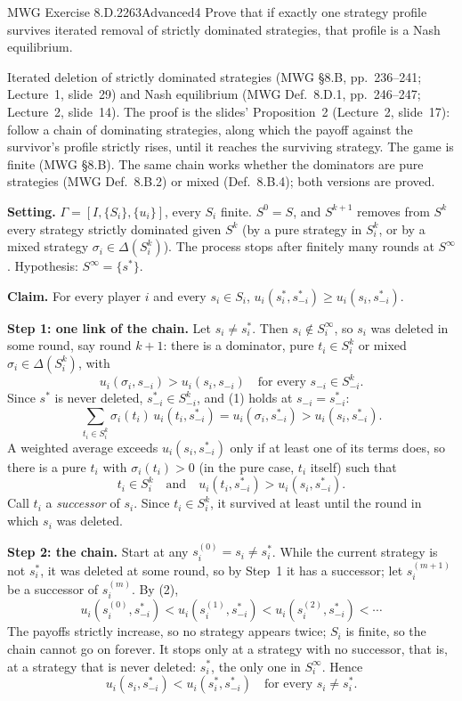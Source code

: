 \begin{exsol}{MWG Exercise 8.D.2}{263}{Advanced}{4}
\asked Prove that if exactly one strategy profile survives iterated removal of strictly dominated
strategies, that profile is a Nash equilibrium.

\method Iterated deletion of strictly dominated strategies (MWG \S8.B, pp.~236--241; Lecture~1,
slide~29) and Nash equilibrium (MWG Def.~8.D.1, pp.~246--247; Lecture~2, slide~14). The proof is
the slides' Proposition~2 (Lecture~2, slide~17): follow a chain of dominating strategies, along
which the payoff against the survivor's profile strictly rises, until it reaches the surviving
strategy. The game is finite (MWG \S8.B). The same chain works whether the dominators are pure
strategies (MWG Def.~8.B.2) or mixed (Def.~8.B.4); both versions are proved.

\solution
\textbf{Setting.} $\Gamma = [I, \{S_i\}, \{u_i\}]$, every $S_i$ finite. $S^0 = S$, and $S^{k+1}$
removes from $S^k$ every strategy strictly dominated given $S^k$ (by a pure strategy in $S^k_i$,
or by a mixed strategy $\sigma_i \in \Delta(S^k_i)$). The process stops after finitely many rounds
at $S^\infty$. Hypothesis: $S^\infty = \{s^*\}$.

\textbf{Claim.} For every player $i$ and every $s_i \in S_i$, $u_i(s_i^*, s_{-i}^*) \ge
u_i(s_i, s_{-i}^*)$.

\textbf{Step 1: one link of the chain.} Let $s_i \ne s_i^*$. Then $s_i \notin S^\infty_i$, so
$s_i$ was deleted in some round, say round $k+1$: there is a dominator, pure $t_i \in S^k_i$ or mixed
$\sigma_i \in \Delta(S^k_i)$, with
\[
  u_i(\sigma_i, s_{-i}) > u_i(s_i, s_{-i}) \quad \text{for every } s_{-i} \in S^k_{-i}. \tag{1}
\]
Since $s^*$ is never deleted, $s^*_{-i} \in S^k_{-i}$, and (1) holds at $s_{-i} = s^*_{-i}$:
\[
  \sum_{t_i \in S^k_i} \sigma_i(t_i)\, u_i(t_i, s^*_{-i}) = u_i(\sigma_i, s^*_{-i}) > u_i(s_i, s^*_{-i}).
\]
A weighted average exceeds $u_i(s_i, s^*_{-i})$ only if at least one of its terms does, so there is
a pure $t_i$ with $\sigma_i(t_i) > 0$ (in the pure case, $t_i$ itself) such that
\[
  t_i \in S^k_i \quad \text{and} \quad u_i(t_i, s^*_{-i}) > u_i(s_i, s^*_{-i}). \tag{2}
\]
Call $t_i$ a \emph{successor} of $s_i$. Since $t_i \in S^k_i$, it survived at least until the round
in which $s_i$ was deleted.

\textbf{Step 2: the chain.} Start at any $s_i^{(0)} = s_i \ne s_i^*$. While the current strategy
is not $s_i^*$, it was deleted at some round, so by Step~1 it has a successor; let $s_i^{(m+1)}$
be a successor of $s_i^{(m)}$. By (2),
\[
  u_i(s_i^{(0)}, s^*_{-i}) < u_i(s_i^{(1)}, s^*_{-i}) < u_i(s_i^{(2)}, s^*_{-i}) < \cdots
\]
The payoffs strictly increase, so no strategy appears twice; $S_i$ is finite, so the chain cannot go
on forever. It stops only at a strategy with no successor, that is, at a strategy that is never
deleted: $s_i^*$, the only one in $S^\infty_i$. Hence
\[
  u_i(s_i, s^*_{-i}) < u_i(s_i^*, s^*_{-i}) \quad \text{for every } s_i \ne s_i^*.
\]


\end{exsol}

